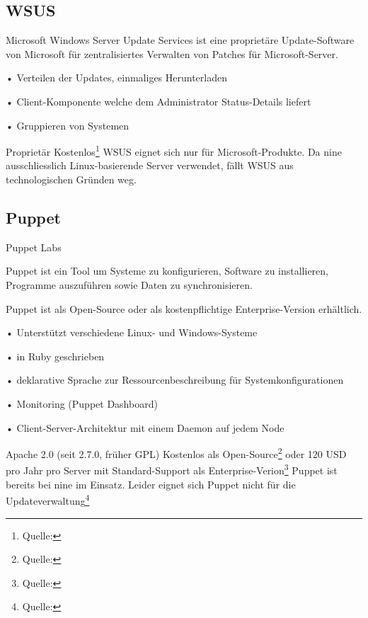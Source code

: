 \subsection*{WSUS}

{Microsoft}
{Windows Server Update Services ist eine proprietäre Update-Software von Microsoft für zentralisiertes Verwalten von Patches für Microsoft-Server.}
{
• Verteilen der Updates, einmaliges Herunterladen

• Client-Komponente welche dem Administrator Status-Details liefert

• Gruppieren von Systemen
}
{Proprietär}
{Kostenlos\footnote{Quelle: }}
{}
{WSUS eignet sich nur für Microsoft-Produkte. Da \gls{nine} ausschliesslich Linux-basierende Server verwendet, fällt WSUS aus technologischen Gründen weg.}

\subsection*{Puppet}

{Puppet Labs}
{Puppet ist ein Tool um Systeme zu konfigurieren, Software zu installieren, Programme auszuführen sowie Daten zu synchronisieren.

Puppet ist als Open-Source oder als kostenpflichtige Enterprise-Version erhältlich. }
{
• Unterstützt verschiedene Linux- und Windows-Systeme

• in Ruby geschrieben

• deklarative Sprache zur Ressourcenbeschreibung für Systemkonfigurationen

• Monitoring (Puppet Dashboard)

• Client-Server-Architektur mit einem Daemon auf jedem Node
}
{Apache 2.0 (seit 2.7.0, früher GPL)}
{Kostenlos als Open-Source\footnote{Quelle: } oder 120 USD pro Jahr pro Server mit Standard-Support als Enterprise-Verion\footnote{Quelle: }}
{}
{Puppet ist bereits bei \gls{nine} im Einsatz. Leider eignet sich Puppet nicht für die Updateverwaltung\footnote{Quelle: }}
